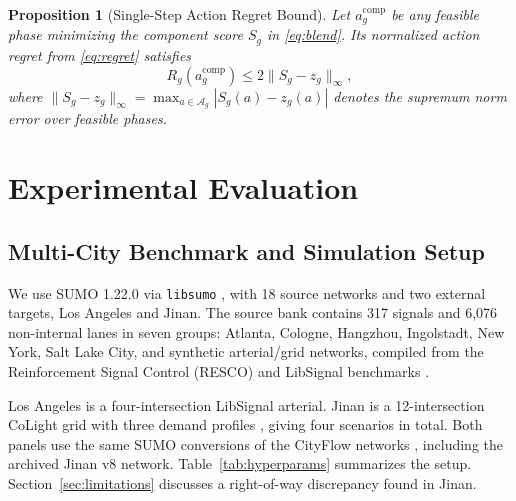 \documentclass[letterpaper,journal]{IEEEtran}
\newtheorem{proposition}{Proposition}
\begin{document}
\begin{proposition}[Single-Step Action Regret Bound]
\label{prop:regret_bound}
Let $a_g^{\mathrm{comp}}$ be any feasible phase minimizing the component score $S_g$ in \eqref{eq:blend}. Its normalized action regret from \eqref{eq:regret} satisfies
\begin{equation}
 R_g(a_g^{\mathrm{comp}})\leq2\|S_g-z_g\|_\infty,
 \label{eq:score-regret-bound}
\end{equation}
where $\|S_g-z_g\|_\infty = \max_{a\in\mathcal A_g}|S_g(a)-z_g(a)|$ denotes the supremum norm error over feasible phases.
\end{proposition}

\section{Experimental Evaluation}
\label{sec:experiments}

\subsection{Multi-City Benchmark and Simulation Setup}
We use SUMO 1.22.0 via \texttt{libsumo} \cite{lopez2018microscopic}, with 18 source networks and two external targets, Los Angeles and Jinan. The source bank contains 317 signals and 6,076 non-internal lanes in seven groups: Atlanta, Cologne, Hangzhou, Ingolstadt, New York, Salt Lake City, and synthetic arterial/grid networks, compiled from the Reinforcement Signal Control (RESCO) and LibSignal benchmarks \cite{ault2021reinforcement,mei2022libsignal}.

Los Angeles is a four-intersection LibSignal arterial. Jinan is a 12-intersection CoLight grid with three demand profiles \cite{wei2019colight}, giving four scenarios in total. Both panels use the same SUMO conversions of the CityFlow networks \cite{zhang2019cityflow}, including the archived Jinan v8 network. Table~\ref{tab:hyperparams} summarizes the setup. Section~\ref{sec:limitations} discusses a right-of-way discrepancy found in Jinan.
\end{document}
